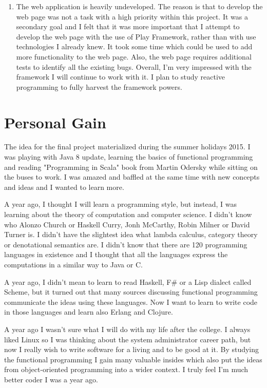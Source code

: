 \documentclass[12pt,twoside,a4paper]{report}
\begin{document}
\begin{enumerate}
\item The web application is heavily undeveloped. The reason is that to develop the web page was not a task with a high priority within this project. It was a secondary goal and I felt that it was more important that I attempt to develop the web page with the use of Play Framework, rather than with use technologies I already knew. It took some time which could be used to add more functionality to the web page. Also, the web page requires additional tests to identify all the existing bugs. Overall, I'm very impressed with the framework I will continue to work with it. I plan to study reactive programming to fully harvest the framework powers.
\end{enumerate}

\section{Personal Gain}\label{7.3}
The idea for the final project materialized during the summer holidays 2015. I was playing with Java 8 update, learning the basics of functional programming and reading "Programming in Scala" book from Martin Odersky\cite{36} while sitting on the buses to work. I was amazed and baffled at the same time with new concepts and ideas and I wanted to learn more.

A year ago, I thought I will learn a programming style, but instead, I was learning about the theory of computation and computer science. I didn't know who Alonzo Church or Haskell Curry, Jonh McCarthy, Robin Milner or David Turner is. I didn't have the slightest idea what lambda calculus, category theory or denotational semantics are. I didn't know that there are 120 programming languages in existence and I thought that all the languages express the computations in a similar way to Java or C.

A year ago, I didn't mean to learn to read Haskell, F\# or a Lisp dialect called Scheme, but it turned out that many sources discussing functional programming communicate the ideas using these languages. Now I want to learn to write code in those languages and learn also Erlang and Clojure.

A year ago I wasn't sure what I will do with my life after the college. I always liked Linux so I was thinking about the system administrator career path, but now I really wish to write software for a living and to be good at it. By studying the functional programming I gain many valuable insides which also put the ideas from object-oriented programming into a wider context. I truly feel I'm much better coder I was a year ago.
\end{document}
